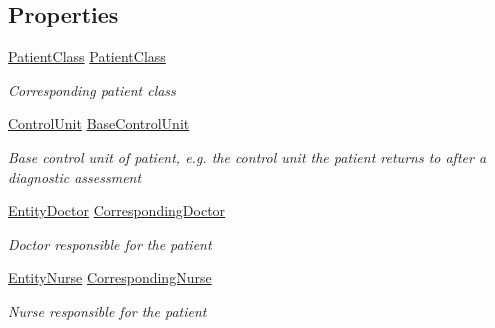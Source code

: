 \subsection*{Properties}
\begin{DoxyCompactItemize}
\item 
\hyperlink{class_general_health_care_elements_1_1_patient_class}{Patient\+Class} \hyperlink{class_general_health_care_elements_1_1_entities_1_1_entity_patient_a4d31aabf4aca7707026b7f964c3463c1}{Patient\+Class}
\begin{DoxyCompactList}\small\item\em Corresponding patient class \end{DoxyCompactList}\item 
\hyperlink{class_simulation_core_1_1_h_c_c_m_elements_1_1_control_unit}{Control\+Unit} \hyperlink{class_general_health_care_elements_1_1_entities_1_1_entity_patient_aa7d6384fe47d43da9f0007005104ad28}{Base\+Control\+Unit}
\begin{DoxyCompactList}\small\item\em Base control unit of patient, e.\+g. the control unit the patient returns to after a diagnostic assessment \end{DoxyCompactList}\item 
\hyperlink{class_general_health_care_elements_1_1_entities_1_1_entity_doctor}{Entity\+Doctor} \hyperlink{class_general_health_care_elements_1_1_entities_1_1_entity_patient_a04cc668cc62e68b45abc0d84730de340}{Corresponding\+Doctor}
\begin{DoxyCompactList}\small\item\em Doctor responsible for the patient \end{DoxyCompactList}\item 
\hyperlink{class_general_health_care_elements_1_1_entities_1_1_entity_nurse}{Entity\+Nurse} \hyperlink{class_general_health_care_elements_1_1_entities_1_1_entity_patient_a93004bcae55083645db3e11c7220088f}{Corresponding\+Nurse}
\begin{DoxyCompactList}\small\item\em Nurse responsible for the patient \end{DoxyCompactList}\item 

\end{DoxyCompactItemize}

